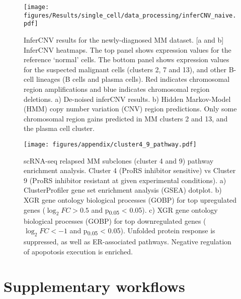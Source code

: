 \begin{figure}[h]
    \centering
    \texttt{[image: figures/Results/single\_cell/data\_processing/inferCNV\_naive.pdf]}
    \caption[inferCNV- newly-diagnosed MM]{InferCNV results for the newly-diagnosed MM dataset.
    [a and b] InferCNV heatmaps.
        The top panel shows expression values for the reference `normal' cells.
        The bottom panel shows expression values for the suspected malignant cells (clusters 2, 7 and 13), and other B-cell lineages (B cells and plasma cells).
        Red indicates chromosomal region amplifications and blue indicates chromosomal region deletions.
    a) De-noised inferCNV results.
    b) Hidden Markov-Model (HMM) copy number variation (CNV) region predictions.
        Only some chromosomal region gains predicted in MM clusters 2 and 13, and the plasma cell cluster.
    }
    \label{fig:inferCNV_naive}
\end{figure}
%

\begin{figure}[h]
    \centering
    \texttt{[image: figures/appendix/cluster4\_9\_pathway.pdf]}
    \caption[scRNA-seq relapsed MM subclone pathway enrichment]{scRNA-seq relapsed MM subclones (cluster 4 and 9) pathway enrichment analysis.
Cluster 4 (ProRS inhibitor sensitive) vs Cluster 9 (ProRS inhibitor resistant at given experimental conditions).
    a) ClusterProfiler gene set enrichment analysis (GSEA) dotplot.
    b) XGR gene ontology biological processes (GOBP) for top upregulated genes ($\log_{2}FC > 0.5$ and p\textsubscript{0.05} < 0.05).
    c) XGR gene ontology biological processes (GOBP) for top downregulated genes ($\log_{2}FC < -1$ and p\textsubscript{0.05} < 0.05).
    Unfolded protein response is suppressed, as well as ER-associated pathways. Negative regulation of apopotosis execution is enriched.
    }
    \label{fig:cluster4_9_pathway}
\end{figure}
%

\chapter{Supplementary workflows}

